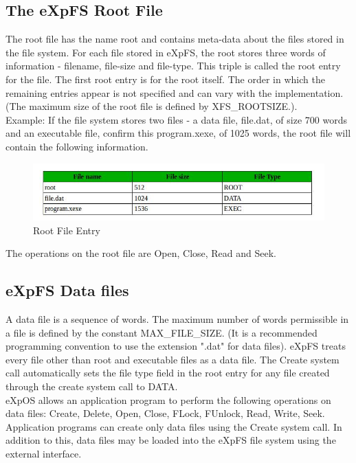 \subsection{The eXpFS Root File}
The root file has the name root and contains meta-data about the files stored in the file system. For each file stored in eXpFS, the root stores three words of information - filename, file-size and file-type. This triple is called the root entry for the file. The first root entry is for the root itself. The order in which the remaining entries appear is not specified and can vary with the implementation. (The maximum size of the root file is defined by XFS\_ROOTSIZE.).
\\
Example: If the file system stores two files - a data file, file.dat, of size 700 words and an executable file, confirm this program.xexe, of 1025 words, the root file will contain the following information. 
\begin{figure}[ht]
\centering
\includegraphics[scale=0.50]{figures/root_entry.jpg}
\caption{\footnotesize Root File Entry}
\label{fig_1}
\end{figure}

The operations on the root file are Open, Close, Read and Seek. 

\subsection{eXpFS Data files}
A data file is a sequence of words. The maximum number of words permissible in a file is defined by the constant MAX\_FILE\_SIZE. (It is a recommended programming convention to use the extension ".dat" for data files). eXpFS treats every file other than root and executable files as a data file. The Create system call automatically sets the file type field in the root entry for any file created through the create system call to DATA.
\\
eXpOS allows an application program to perform the following operations on data files: Create, Delete, Open, Close, FLock, FUnlock, Read, Write, Seek. Application programs can create only data files using the Create system call. In addition to this, data files may be loaded into the eXpFS file system using the external interface. 

